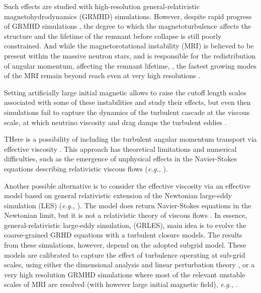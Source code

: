 \documentclass[11pt,a4paper,headinclude=true,DIV=14,BCOR=8mm,chapterprefix,listof=totoc,twoside,openright,abstracton]{scrbook}
\begin{document}
Such effects are studied with high-resolution general-relativistic magnetohydrodynamics (GRMHD) simulations. However, despite rapid progress of GRMHD simulations \cite{Rezzolla:2011da,Kiuchi:2014hja,Ruiz:2016rai},
the degree to which the magnetoturbulence affects the structure and the lifetime of the remnant 
before collapse is still poorly constrained.
And while the magnetorotational instability (MRI) \cite{Balbus:1991} is believed to be present within the 
massive neutron stars, and is responsible for the redistribution of angular momentum, affecting the 
remnant lifetime, \cite{Duez:2006qe,Siegel:2013nrw}, the fastest growing modes of the MRI remain beyond 
reach even at very high resolutions \cite{Kiuchi:2014hja}.

Setting artificially large initial magnetic allows to raise the cutoff length scales associated with some of these instabilities and study their effects, but even then simulations fail to capture the dynamics of the turbulent cascade at the viscous scale, at which neutrino viscosity and drag damps the turbulent eddies \cite{Guilet:2016sqd}. 

THere is a possibility of including the turbulent angular momentum transport via effective viscosity
\cite{Duez:2004nf}. 
This approach has theoretical limitations and numerical difficulties, such as the emergence of unphysical effects in the Navier-Stokes equations describing relativistic viscous flows (\textit{e.g.,} \cite{Hiscock:1985}).

Another possible alternative is to consider the effective viscosity via an effective model based on 
general relativistic extension of the Newtonian large-eddy simulation (LES) (\textit{e.g.,} \cite{Miesch:2015les}). The model does return Navier-Stokes equations in the Newtonian limit, but it is not a relativistic theory of viscous flows \cite{Radice:2017zta}.
In essence, general-relativistic large-eddy simulation, (GRLES), main idea is to evolve the coarse-grained GRHD equations with a turbulent closure models.
The results from these simulations, however, depend on the adopted subgrid model. 
These models are calibrated to capture the effect of turbulence operating at sub-grid scales,
using either the dimensional analysis and linear perturbation theory \cite{Radice:2017zta}, or a very high resolution GRMHD simulations where most of the relevant unstable scales of MRI are resolved (with however large initial magnetic field), \textit{e.g.,} \cite{Kiuchi:2017zzg}.
\end{document}
